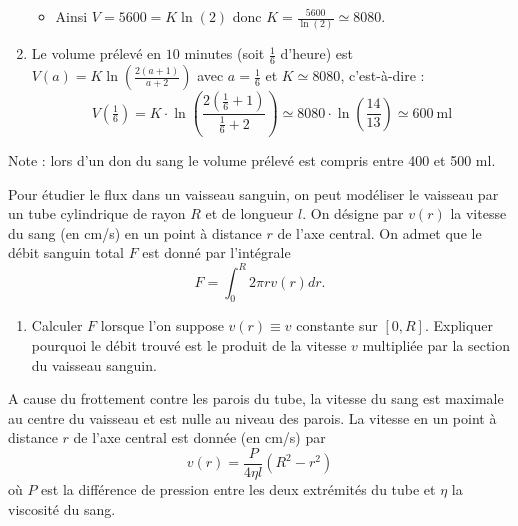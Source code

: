 \documentclass[11pt,class=report,crop=false]{standalone}
\begin{document}
\begin{enumerate}
\begin{itemize}
  \item Ainsi $V = 5600 = K \ln(2)$ donc $K = \frac{5600}{\ln(2)} \simeq 8080$.
  \end{itemize}

  \item Le volume prélevé en $10$ minutes (soit $\frac16$ d'heure) est
  $V(a) = K \ln\left( \frac{2(a+1)}{a+2} \right)$
  avec $a=\frac16$ et $K \simeq 8080$, c'est-à-dire :
  $$V(\tfrac16) =K \cdot \ln\left( \frac{2(\frac16+1)}{\frac16+2} \right)
  \simeq 8080 \cdot \ln\left( \frac{14}{13} \right)
  \simeq 600~\text{ml}$$
\end{enumerate}

Note : lors d'un don du sang le volume prélevé est compris entre 400 et 500 ml.
\fincorrection
\finexercice


\exercice{}
\enonce
Pour étudier le flux dans un vaisseau sanguin, on peut modéliser 
le vaisseau par un tube cylindrique de rayon $R$ et de longueur 
$l$. On désigne par $v(r)$ la vitesse du sang (en cm/s) en un point 
à distance $r$ de l'axe central. On admet que le débit sanguin total 
$F$ est donné par l'intégrale
\begin{equation}
F = \int_0^R 2 \pi r v(r) dr. \label{debit-sang}
\end{equation}

\begin{enumerate}
	\item Calculer $F$ lorsque l'on suppose $v(r) \equiv v$ constante 
	sur $[0,R]$. Expliquer pourquoi le débit trouvé est le produit de 
	la vitesse $v$ multipliée par la section du vaisseau sanguin.
\end{enumerate}

\begin{center} 
	 
\end{center} 

A cause du frottement contre les parois du tube, la vitesse du sang 
est maximale au centre du vaisseau et est nulle au niveau des parois. 
La vitesse en un point à distance $r$ de l'axe central est donnée (en 
{cm/s}) par
\begin{equation}
v(r)=\frac {P} {4 \eta l} (R^2-r^2) \label{vitesse-sang}
\end{equation}
où $P$ est la différence de pression entre les deux extrémités du tube 
et $\eta$ la viscosité du sang.
\end{document}
